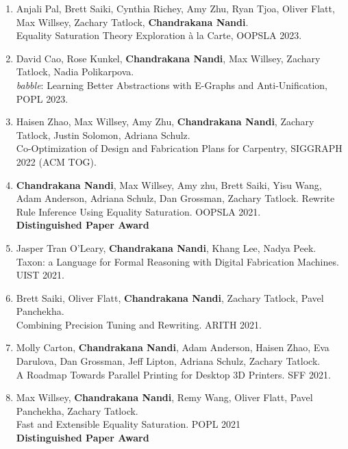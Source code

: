 \documentclass[margin, 10pt]{res} %
\begin{document}
\begin{resume}
\begin{enumerate}
  \item Anjali Pal, Brett Saiki, Cynthia Richey, Amy Zhu, Ryan Tjoa, Oliver Flatt, Max Willsey, Zachary Tatlock, \textbf{Chandrakana Nandi}. \\
    Equality Saturation Theory Exploration à la Carte, OOPSLA 2023.

  \item David Cao, Rose Kunkel, \textbf{Chandrakana Nandi}, Max Willsey, Zachary Tatlock, Nadia Polikarpova. \\
    \textit{babble}: Learning Better Abstractions with E-Graphs and Anti-Unification, POPL 2023.

  \item Haisen  Zhao, Max Willsey, Amy Zhu, \textbf{Chandrakana Nandi}, Zachary Tatlock, Justin Solomon, Adriana Schulz. \\
    Co-Optimization of Design and Fabrication Plans for Carpentry, SIGGRAPH 2022 (ACM TOG).

  \item \textbf{Chandrakana Nandi}, Max Willsey, Amy zhu, Brett Saiki, Yisu Wang, Adam Anderson, Adriana Schulz, Dan Grossman, Zachary Tatlock.
    Rewrite Rule Inference Using Equality Saturation. OOPSLA 2021. \\
    \textbf{Distinguished Paper Award}

  \item Jasper Tran O'Leary, \textbf{Chandrakana Nandi}, Khang Lee, Nadya Peek. \\
  Taxon: a Language for Formal Reasoning with Digital Fabrication Machines. UIST 2021.

\item Brett Saiki, Oliver Flatt, \textbf{Chandrakana Nandi}, Zachary Tatlock, Pavel Panchekha. \\
  Combining Precision Tuning and Rewriting. ARITH 2021.

\item Molly Carton, \textbf{Chandrakana Nandi}, Adam Anderson, Haisen Zhao, Eva Darulova, Dan Grossman, Jeff Lipton, Adriana Schulz, Zachary Tatlock. \\
  A Roadmap Towards Parallel Printing for Desktop 3D Printers. SFF 2021.

\item Max Willsey, \textbf{Chandrakana Nandi}, Remy Wang, Oliver Flatt, Pavel Panchekha, Zachary Tatlock. \\
    Fast and Extensible Equality Saturation. POPL 2021 \\
    \textbf{Distinguished Paper Award}


\end{enumerate}
\end{resume}
\end{document}
